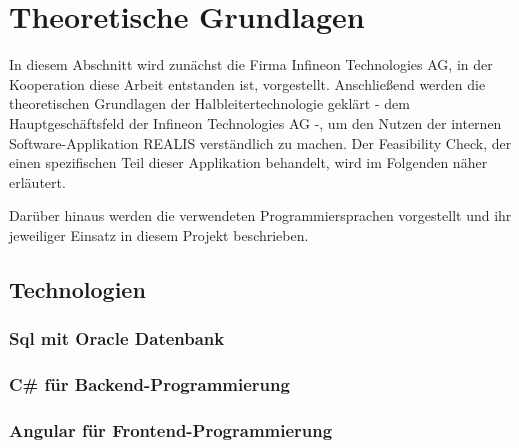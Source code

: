 \chapter{Theoretische Grundlagen}\label{Chap:TheoretischeGrundlagen}
In diesem Abschnitt wird zunächst die Firma Infineon Technologies AG, in der Kooperation diese Arbeit entstanden ist, vorgestellt. Anschließend werden die theoretischen Grundlagen der Halbleitertechnologie geklärt - dem Hauptgeschäftsfeld der Infineon Technologies AG -, um den Nutzen der internen Software-Applikation \gls{REALIS} verständlich zu machen. Der Feasibility Check, der einen spezifischen Teil dieser Applikation behandelt, wird im Folgenden näher erläutert.

Darüber hinaus werden die verwendeten Programmiersprachen vorgestellt und ihr jeweiliger Einsatz in diesem Projekt beschrieben.







\section{Technologien}

\subsection{Sql mit Oracle Datenbank}

\subsection{C\# für Backend-Programmierung}

\subsection{Angular für Frontend-Programmierung}